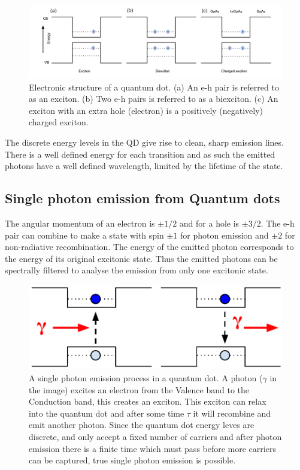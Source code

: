 \begin{figure}[h!] \begin{center}
\includegraphics[width=1\textwidth]{images/estructure.pdf} \end{center}
\caption{
Electronic structure of a quantum dot. (a) An e-h pair is referred to as an
exciton. (b) Two e-h pairs is referred to as a biexciton. (c) An exciton with an
extra hole (electron) is a positively (negatively) charged exciton.
} \label{fig:estructure} \end{figure}

The discrete energy levels in the QD give rise to clean, sharp emission lines.
There is a well defined energy for each transition and as such the emitted
photons have a well defined wavelength, limited by the lifetime of the state.

\subsection{Single photon emission from Quantum dots }

The angular momentum of an electron is $\pm 1/2$ and for a hole is $\pm 3/2$.
The e-h pair can combine to make a state with spin $\pm 1$ for photon emission
and $\pm 2$ for non-radiative recombination. The energy of the emitted photon
corresponds to the energy of its original excitonic state. Thus the emitted
photons can be spectrally filtered to analyse the emission from only one
excitonic state.

\begin{figure}[h!] \begin{center}
\includegraphics[width=1\textwidth]{images/qd_photon.pdf} \end{center}
\caption{
A single photon emission process in a quantum dot. A photon ($\gamma$ in the
image) excites an electron from the Valence band to the Conduction band, this
creates an exciton. This exciton can relax into the quantum dot and after some
time $\tau$ it will recombine and emit another photon. Since the quantum dot
energy leves are discrete, and only accept a fixed number of carriers and after
photon emission there is a finite time which must pass before more carriers can
be captured, true single photon emission is possible.
} \label{fig:qd_photon}
\end{figure}

